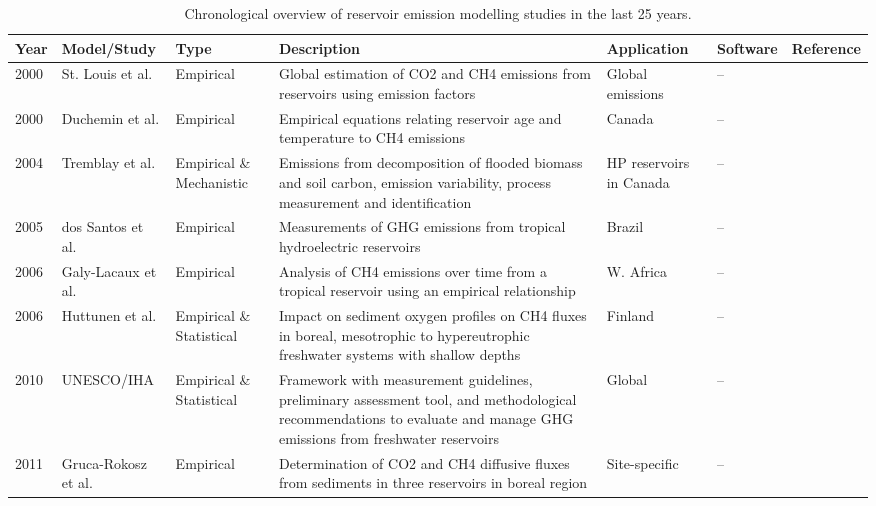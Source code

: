 \documentclass[10pt]{article}
\begin{document}
{
\renewcommand{\baselinestretch}{1.3}\normalsize
\begin{table}
\scriptsize
\centering
\caption{Chronological overview of reservoir emission modelling studies in the last 25 years.}
\label{supp-tab:reservoir_models}
\begin{adjustbox}{max height=\textheight, center}
\begin{tabular}{p{0.03\textheight}p{0.11\textheight}p{0.07\textheight}p{0.48\textheight}p{0.10\textheight}p{0.09\textheight}p{0.12\textheight}}
\toprule
\textbf{Year} & \textbf{Model/Study} & \textbf{Type} & \textbf{Description} & \textbf{Application} & \textbf{Software} & \textbf{Reference} \\
\midrule
2000 & St. Louis et al. & Empirical & Global estimation of \ac{CO2} and \ac{CH4} emissions from reservoirs using emission factors & Global emissions & -- & \citet{Louis2000} \\
2000 & Duchemin et al. & Empirical & Empirical equations relating reservoir age and temperature to \ac{CH4} emissions & Canada & -- & \citet{Duchemin2000} \\
2004 & Tremblay et al. & Empirical \& Mechanistic & Emissions from decomposition of flooded biomass and soil carbon, emission variability, process measurement and identification & HP reservoirs in Canada & -- & \citet{Tremblay2004} \\
2005 & dos Santos et al. & Empirical & Measurements of GHG emissions from tropical hydroelectric reservoirs & Brazil & -- & \citet{dosSantos2006} \\
2006 & Galy-Lacaux et al. & Empirical & Analysis of \ac{CH4} emissions over time from a tropical reservoir using an empirical relationship & W. Africa & -- & \citet{GalyLacaux2006} \\
2006 & Huttunen et al. & Empirical \& Statistical & Impact on sediment oxygen profiles on \ac{CH4} fluxes in boreal, mesotrophic to hypereutrophic freshwater systems with shallow depths & Finland & -- & \citet{Huttunen2006} \\
2010 & UNESCO/IHA & Empirical \& Statistical & Framework with measurement guidelines, preliminary assessment tool, and methodological recommendations to evaluate and manage GHG emissions from freshwater reservoirs & Global & -- & \citet{unesco_iha_ghg_2010} \\
2011 & Gruca-Rokosz et al. & Empirical & Determination of \ac{CO2} and \ac{CH4} diffusive fluxes from sediments in three reservoirs in boreal region & Site-specific & -- & \citet{gruca2011} \\

\end{tabular}
\end{adjustbox}
\end{table}}
\end{document}
